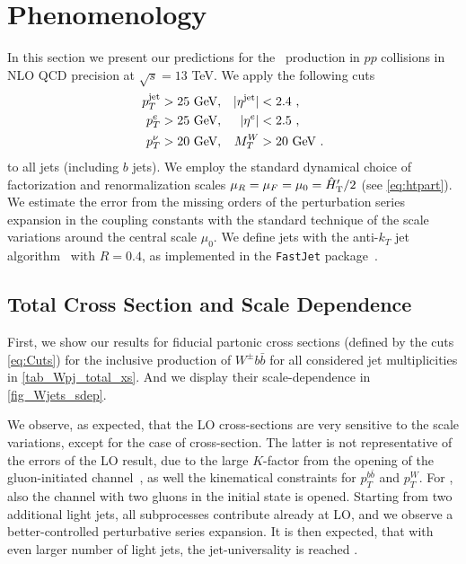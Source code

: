 \section{Phenomenology}
\label{sec:wbb:pheno}
In this section we present our predictions for the \Wbbn~production in
$pp$ collisions in NLO QCD precision at $\sqrt{s}=13$ TeV. 
We apply the following cuts
\begin{align}
  p_T^{\text{jet}}&>25\text{ GeV},& |\eta^{\text{jet}}|&<2.4\ ,\notag\\
  p_T^{e}&>25\text{ GeV},& |\eta^{e}|&<2.5\ ,\notag\\
  p_T^{\nu}&>20\text{ GeV},& M_T^W &> 20\text{ GeV}\ .
  \label{eq:Cuts}
\end{align}
to all jets (including $b$ jets).
We employ the standard dynamical choice of factorization and renormalization scales $\mu_R=\mu_F=\mu_0={\hat H}_{\mathrm T}'/2$ (see \cref{eq:htpart}).
We estimate the error from the missing orders of the perturbation series expansion in the coupling constants with the standard technique of
the scale variations around the central scale $\mu_0$. 
We define jets with the anti-$k_T$ jet algorithm~\cite{antikT} with $R=0.4$, as implemented in the
\texttt{FastJet} package~\cite{Cacciari:2011ma}.

\subsection{Total Cross Section and Scale Dependence}
\label{totalxsw}
First, we show our results for fiducial partonic cross sections (defined by the cuts \cref{eq:Cuts})
for the inclusive production of $W^{\pm}b\bar{b}$ for all considered jet multiplicities in \cref{tab_Wpj_total_xs}.
And we display their scale-dependence in \cref{fig_Wjets_sdep}.

We observe, as expected, that the LO cross-sections are very sensitive to the scale variations,
except for the case of \Wbb{} cross-section.
The latter is not representative of the errors of the LO result, due
to the large $K$-factor from the opening of the gluon-initiated channel~\cite{Ellis:1998fv,FebresCordero:2006sj,Cordero:2009kv},
as well the kinematical constraints for $p_T^{b\bar b}$ and $p_T^W$.
For \Wbbj{}, also the channel with two gluons in the initial state is opened.
Starting from two additional light jets, all subprocesses contribute already at LO,
and we observe a better-controlled perturbative series expansion.
It is then expected, that with even larger number of light jets,
the jet-universality is reached \cite{BH:Wratios,BH:W5j}.


